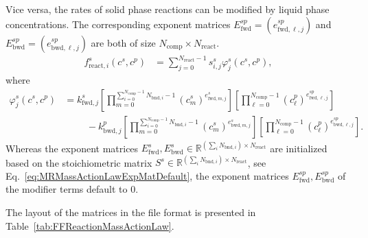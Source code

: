 Vice versa, the rates of solid phase reactions can be modified by liquid phase concentrations.
The corresponding exponent matrices $E^{sp}_{\text{fwd}} = (e^{sp}_{\text{fwd},\ell,j})$ and $E^{sp}_{\text{bwd}} = (e^{sp}_{\text{bwd},\ell,j})$ are both of size $N_{\text{comp}} \times N_{\text{react}}$.
\begin{align*}
  f_{\text{react},i}^s\left(c^s, c^p\right) &= \sum_{j=0}^{N_{\text{react}}-1} s_{i,j}^s \varphi^s_j\left(c^s, c^p\right),
\end{align*}
where
\begin{equation*} \begin{split}
  \varphi^s_j(c^s, c^p) &= k^s_{\text{fwd},j} \left[\prod_{m=0}^{\sum_{i=0}^{N_{\text{comp}}-1} N_{\text{bnd},i}-1} \left(c^s_{m}\right)^{e^{s}_{\text{fwd},m,j}}\right] \left[\prod_{\ell=0}^{N_{\text{comp}}-1} \left(c^p_{\ell}\right)^{e^{sp}_{\text{fwd},\ell,j}}\right] \\
  &\phantom{=}\quad - k^p_{\text{bwd},j} \left[\prod_{m=0}^{\sum_{i=0}^{N_{\text{comp}}-1} N_{\text{bnd},i}-1} \left(c^s_{m}\right)^{e^{s}_{\text{bwd},m,j}}\right] \left[\prod_{\ell=0}^{N_{\text{comp}}-1} \left(c^p_{\ell}\right)^{e^{sp}_{\text{bwd},\ell,j}}\right].
\end{split} \end{equation*}
Whereas the exponent matrices $E^{s}_{\text{fwd}}, E^{s}_{\text{bwd}} \in \mathds{R}^{(\sum_i N_{\text{bnd},i}) \times N_{\text{react}}}$ are initialized based on the stoichiometric matrix $S^{s} \in \mathds{R}^{(\sum_i N_{\text{bnd},i}) \times N_{\text{react}}}$, see Eq.~\eqref{eq:MRMassActionLawExpMatDefault}, the exponent matrices $E^{sp}_{\text{fwd}}, E^{sp}_{\text{bwd}}$ of the modifier terms default to $0$.

The layout of the matrices in the file format is presented in Table~\ref{tab:FFReactionMassActionLaw}.
